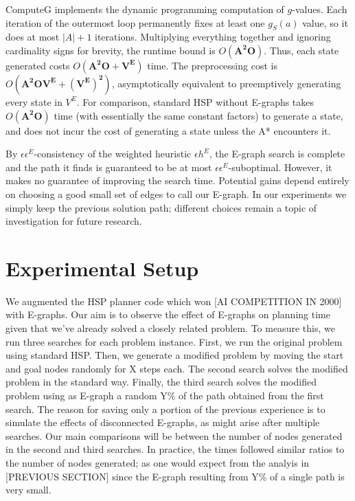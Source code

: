 \documentclass[letterpaper]{article}
\begin{document}
ComputeG implements the dynamic programming computation of $g$-values. Each iteration of the outermost loop permanently fixes at least one $g_S(a)$ value, so it does at most $|A|+1$ iterations. Multiplying everything together and ignoring cardinality signs for brevity, the runtime bound is $O(\mathbf{A^2O})$. Thus, each state generated costs $O(\mathbf{A^2O + V^E})$ time. The preprocessing cost is $O(\mathbf{A^2OV^E + (V^E)^2})$, asymptotically equivalent to preemptively generating every state in $V^E$. For comparison, standard HSP without E-graphs takes $O(\mathbf{A^2O})$ time (with essentially the same constant factors) to generate a state, and does not incur the cost of generating a state unless the A* encounters it.

By $\epsilon\epsilon^E$-consistency of the weighted heuristic $\epsilon h^E$, the E-graph search is complete and the path it finds is guaranteed to be at most $\epsilon \epsilon^E$-suboptimal. However, it makes no guarantee of improving the search time. Potential gains depend entirely on choosing a good small set of edges to call our E-graph. In our experiments we simply keep the previous solution path; different choices remain a topic of investigation for future research.

\section{Experimental Setup}

We augmented the HSP planner code \cite{bonet2001planning} which won [AI COMPETITION IN 2000] with E-graphs. Our aim is to observe the effect of E-graphs on planning time given that we've already solved a closely related problem. To measure this, we run three searches for each problem instance. First, we run the original problem using standard HSP. Then, we generate a modified problem by moving the start and goal nodes randomly for X steps each. The second search solves the modified problem in the standard way. Finally, the third search solves the modified problem using as E-graph a random Y\% of the path obtained from the first search. The reason for saving only a portion of the previous experience is to simulate the effects of disconnected E-graphs, as might arise after multiple searches. Our main comparisons will be between the number of nodes generated in the second and third searches. In practice, the times followed similar ratios to the number of nodes generated; as one would expect from the analyis in [PREVIOUS SECTION] since the E-graph resulting from Y\% of a single path is very small.
\end{document}
